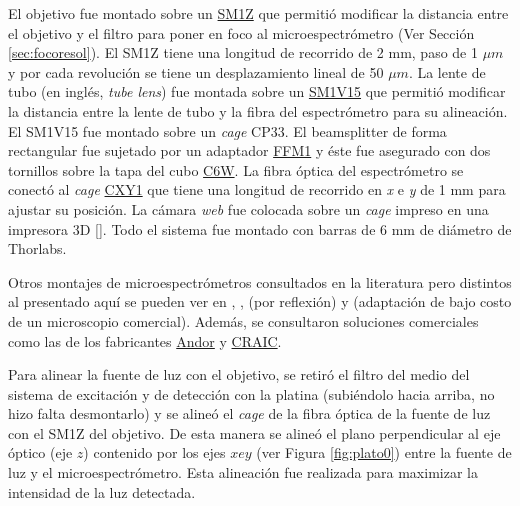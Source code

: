 El objetivo fue montado sobre un \href{https://www.thorlabs.com/thorProduct.cfm?partNumber=SM1Z\#ad-image-0}{SM1Z} que permitió modificar la distancia entre el objetivo y el filtro para poner en foco al microespectrómetro (Ver Sección \ref{sec:focoresol}). El SM1Z tiene una longitud de recorrido de 2 mm, paso de 1 $\mu m$ y por cada revolución se tiene un desplazamiento lineal de 50 $\mu m$.  La lente de tubo (en inglés, \textit{tube lens}) fue montada sobre un \href{https://www.thorlabs.com/thorproduct.cfm?partnumber=SM1V15}{SM1V15} que permitió modificar la distancia entre la lente de tubo y la fibra del espectrómetro para su alineación. El SM1V15 fue montado sobre un \textit{cage} CP33. El beamsplitter de forma rectangular fue sujetado por un adaptador \href{https://www.thorlabs.com/thorproduct.cfm?partnumber=FFM1\#ad-image-0}{FFM1} y éste fue asegurado con dos tornillos sobre la tapa del cubo \href{https://www.thorlabs.com/thorproduct.cfm?partnumber=C6W}{C6W}. La fibra óptica del espectrómetro se conectó al \textit{cage} \href{https://www.thorlabs.com/thorproduct.cfm?partnumber=CXY1\#ad-image-0}{CXY1} que tiene una longitud de recorrido en \textit{x} e \textit{y} de 1 mm para ajustar su posición. La cámara \textit{web} fue colocada sobre un \textit{cage} impreso en una impresora 3D [\href{https://github.com/jrr1984/open_frame_XYStage/blob/master/3dprintedparts/STLs/CAGE\_1pulgada.STL}{\faCubes}]. Todo el sistema fue montado con barras de 6 mm de diámetro de Thorlabs.

Otros montajes de microespectrómetros consultados en la literatura pero distintos al presentado aquí se pueden ver en \cite{frosch}, \cite{wong}, \cite{mour}(por reflexión) y \cite{frise} (adaptación de bajo costo de un microscopio comercial). Además, se consultaron soluciones comerciales como las de los fabricantes \href{https://andor.oxinst.com/learning/view/article/modular-solutions-for-microspectroscopy}{Andor} y \href{http://www.microspectra.com/}{CRAIC}.

Para alinear la fuente de luz con el objetivo, se retiró el filtro del medio del sistema de excitación y de detección con la platina (subiéndolo hacia arriba, no hizo falta desmontarlo) y se alineó el \textit{cage} de la fibra óptica de la fuente de luz con el SM1Z del objetivo. De esta manera se alineó el plano perpendicular al eje óptico (eje $\textit{z}$) contenido por los ejes $\textit{x} e \textit{y}$ (ver Figura \ref{fig:plato0}) entre la fuente de luz y el microespectrómetro. Esta alineación fue realizada para maximizar la intensidad de la luz detectada.

